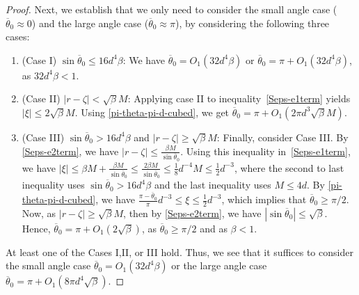 \documentclass[11pt]{article}
\newcommand{\thetabar}{\overline{\theta}}
\begin{document}
\begin{proof}
Next, we establish that we only need to consider the small angle case ($\thetabar_0 \approx 0$) and the large angle case ($\thetabar_0 \approx \pi$), by considering the following three cases:
\begin{enumerate}
\item[] (Case I) $\sin \thetabar_0 \leq 16 d^4 \beta$: We have $\thetabar_0 = O_1(32 d^4 \beta)$ or $\thetabar_0 = \pi + O_1(32 d^4 \beta)$, as $32 d^4 \beta < 1$.

\item[] (Case II) $|r -\zeta| < \sqrt{\beta} M$: Applying case II to inequality~\eqref{Seps-e1term} yields $|\xi| \leq 2 \sqrt{\beta} M$.  Using \eqref{pi-theta-pi-d-cubed}, we get $\thetabar_0 = \pi + O_1(2 \pi d^3 \sqrt{\beta} M)$.

\item[] (Case III) $\sin \thetabar_0 > 16 d^4 \beta$ and $|r - \zeta| \geq \sqrt{\beta} M$:
   Finally, consider Case III.  By \eqref{Seps-e2term}, we have $|r - \zeta| \leq \frac{\beta M}{\sin\thetabar_0}$.
Using this inequality in~\eqref{Seps-e1term}, we have $|\xi| \leq \beta M + \frac{\beta M}{\sin \thetabar_0} \leq \frac{2 \beta M}{\sin \thetabar_0} \leq \frac{1}{8} d^{-4} M \leq \frac{1}{2} d^{-3}$, where the second to last inequality uses $\sin \thetabar_0 > 16 d^4 \beta$ and the last inequality uses $M \leq 4 d$.  By \eqref{pi-theta-pi-d-cubed},  we have $\frac{\pi - \thetabar_0}{\pi} d^{-3} \leq \xi \leq \frac{1}{2} d^{-3}$, which implies that $\thetabar_0 \geq \pi/2$.  Now, as $|r - \zeta| \geq \sqrt{\beta}M$, then by \eqref{Seps-e2term}, we have $|\sin\thetabar_0| \leq \sqrt{\beta}$.  Hence,  $\thetabar_0 = \pi + O_1(2 \sqrt{\beta})$, as $\thetabar_0 \geq \pi/2$ and as $\beta < 1$.
\end{enumerate}
At least one of the Cases I,II, or III hold. Thus, we see that it suffices to consider the small angle case $\thetabar_0 = O_1(32 d^4 \beta)$ or the large angle case $\thetabar_0 = \pi + O_1(8 \pi d^4 \sqrt{\beta})$.



\end{proof}
\end{document}
